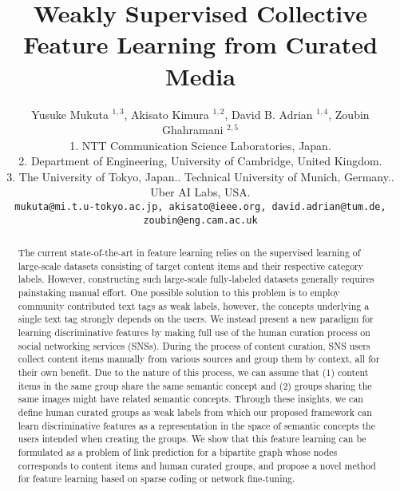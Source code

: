 \documentclass[letterpaper]{article} %
\begin{document}
\title{Weakly Supervised Collective Feature Learning from Curated Media}
\author{%
  Yusuke Mukuta $^{1,3}$, Akisato Kimura $^{1,2}$, David B. Adrian $^{1,4}$, Zoubin Ghahramani $^{2,5}$\\
  1. NTT Communication Science Laboratories, Japan.\\
  2. Department of Engineering, University of Cambridge, United Kingdom.\\
  3. The University of Tokyo, Japan.. Technical University of Munich, Germany.. Uber AI Labs, USA.\\
  {\tt\small mukuta@mi.t.u-tokyo.ac.jp, akisato@ieee.org, david.adrian@tum.de, zoubin@eng.cam.ac.uk}
}

\maketitle

\begin{abstract}
The current state-of-the-art in feature learning relies on the supervised learning of large-scale datasets consisting of target content items and their respective category labels.
%
However, constructing such large-scale fully-labeled datasets generally requires painstaking manual effort.
%
One possible solution to this problem is to employ community contributed text tags as weak labels, however, the concepts underlying a single text tag strongly depends on the users.
%
We instead present a new paradigm for learning discriminative features by making full use of the human curation process on social networking services (SNSs).
%
During the process of content curation, SNS users collect content items manually from various sources and group them by context, all for their own benefit.
%
Due to the nature of this process, we can assume that (1) content items in the same group share the same semantic concept and (2) groups sharing the same images might have related semantic concepts.
%
Through these insights, we can define human curated groups as weak labels from which our proposed framework can learn discriminative features as a representation in the space of semantic concepts the users intended when creating the groups.
%
We show that this feature learning can be formulated as a problem of link prediction for a bipartite graph whose nodes corresponds to content items and human curated groups, and propose a novel method for feature learning based on sparse coding or network fine-tuning.
\end{abstract}
\end{document}
